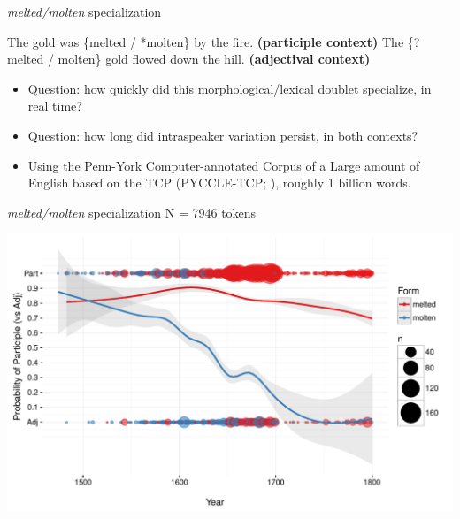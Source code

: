 \documentclass[hyperref={pdfpagelabels=false}]{beamer}
\begin{document}
\begin{frame}{\textsl{melted/molten} specialization}
\begin{exe}
	\ex The gold was \{melted / *molten\} by the fire. \textbf{(participle context)}
	\ex The \{?melted / molten\} gold flowed down the hill. \textbf{(adjectival context)}
\end{exe}
\begin{itemize}
\item Question: how quickly did this morphological/lexical doublet specialize, in real time?

\item Question: how long did intraspeaker variation persist, in both contexts?
\item Using the {P}enn-{Y}ork {C}omputer-annotated {C}orpus of a {L}arge amount of {E}nglish based on the {TCP (PYCCLE-TCP; \citealt{pyccle})}, roughly 1 billion words.
\end{itemize}
\end{frame}


\begin{frame}{\textsl{melted/molten} specialization N =  7946 tokens}

\includegraphics[width=1.128\textwidth]{ContextByDateUnbinnedWithDots2.pdf}
\end{frame}
\end{document}
